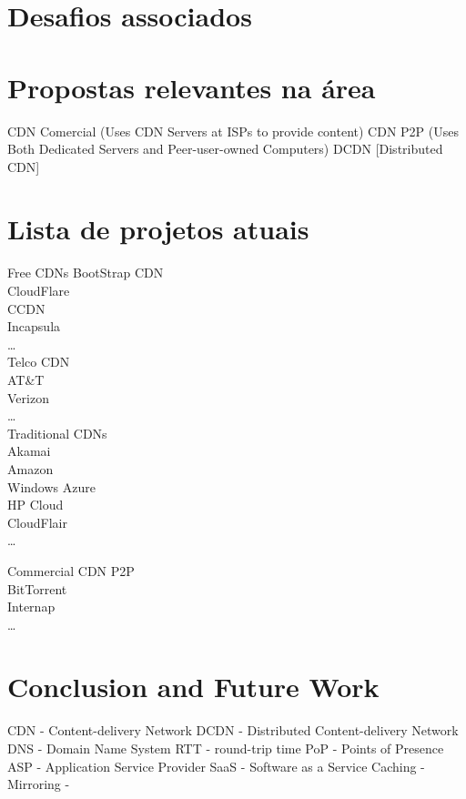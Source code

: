 \documentclass{llncs}
\begin{document}
\section{Desafios associados}




\section{Propostas relevantes na área} 
\if
	CDN Comercial (Uses CDN Servers at ISPs to provide content)
	CDN P2P (Uses Both Dedicated Servers and Peer-user-owned Computers)
	DCDN [Distributed CDN]
\fi

\section{Lista de projetos atuais}
	
	
	
	Free CDNs
		BootStrap CDN\\
		CloudFlare\\
		CCDN\\
		Incapsula\\
		\dots\\
	Telco CDN\\
		AT\&T\\
		Verizon\\
		\dots\\
	Traditional CDNs\\
		Akamai\\
		Amazon\\
		Windows Azure\\
		HP Cloud\\
		CloudFlair\\
		\dots 

	Commercial CDN P2P\\
		BitTorrent\\
		Internap\\
		\dots\\



\section{Conclusion and Future Work}




 
	CDN - Content-delivery Network
	DCDN - Distributed Content-delivery Network
	DNS - Domain Name System
	RTT - round-trip time
	PoP - Points of Presence
	ASP - Application Service Provider
	SaaS - Software as a Service
	Caching -
	Mirroring -
	
\end{document}
